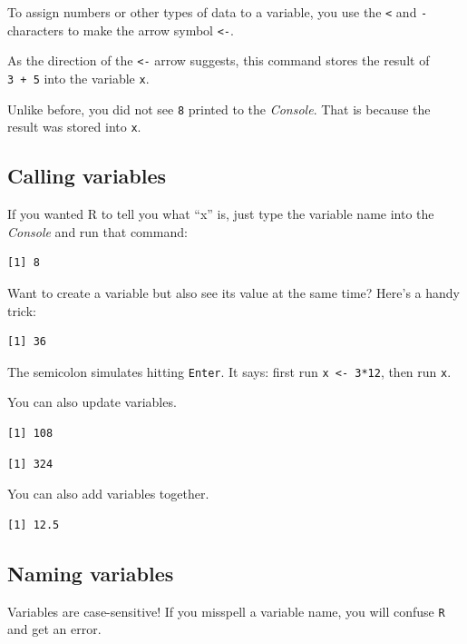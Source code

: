\documentclass[
]{book}
\begin{document}
To assign numbers or other types of data to a variable, you use the \texttt{\textless{}} and \texttt{-} characters to make the arrow symbol \texttt{\textless{}-}.

As the direction of the \texttt{\textless{}-} arrow suggests, this command stores the result of \texttt{3\ +\ 5} into the variable \texttt{x}.

Unlike before, you did not see \texttt{8} printed to the \emph{Console}. That is because the result was stored into \texttt{x}.

\hypertarget{calling-variables}{%
\subsection*{Calling variables}\label{calling-variables}}

If you wanted R to tell you what ``x'' is, just type the variable name into the \emph{Console} and run that command:

\begin{verbatim}
[1] 8
\end{verbatim}

Want to create a variable but also see its value at the same time? Here's a handy trick:

\begin{verbatim}
[1] 36
\end{verbatim}

The semicolon simulates hitting \texttt{Enter}. It says: first run \texttt{x\ \textless{}-\ 3*12}, then run \texttt{x}.

You can also update variables.

\begin{verbatim}
[1] 108
\end{verbatim}

\begin{verbatim}
[1] 324
\end{verbatim}

You can also add variables together.

\begin{verbatim}
[1] 12.5
\end{verbatim}

\hypertarget{naming-variables}{%
\subsection{Naming variables}\label{naming-variables}}

Variables are case-sensitive! If you misspell a variable name, you will confuse \texttt{R} and get an error.
\end{document}
